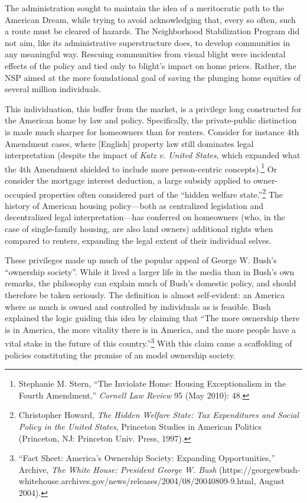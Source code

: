 \documentclass[12pt,oneside]{psthesis}
\begin{document}
The administration sought to maintain the idea of a meritocratic path to the American Dream, while trying to avoid acknowledging that, every so often, such a route must be cleared of hazards.
The Neighborhood Stabilization Program did not aim, like its administrative superstructure does, to develop communities in any meaningful way.
Rescuing communities from visual blight were incidental effects of the policy and tied only to blight's impact on home prices.
Rather, the NSP aimed at the more foundational goal of saving the plunging home equities of several million individuals.

This individuation, this buffer from the market, is a privilege long constructed for the American home by law and policy.
Specifically, the private-public distinction is made much sharper for homeowners than for renters.
Consider for instance 4th Amendment cases, where {[}English{]} property law still dominates legal interpretation (despite the impact of \emph{Katz v. United States}, which expanded what the 4th Amendment shielded to include more person-centric concepts).\footnote{Stephanie M. Stern, ``The Inviolate Home: Housing Exceptionalism in the Fourth Amendment,'' \emph{Cornell Law Review} 95 (May 2010): 48.}
Or consider the mortgage interest deduction, a large subsidy applied to owner-occupied properties often considered part of the ``hidden welfare state.''\footnote{Christopher Howard, \emph{The Hidden Welfare State: Tax Expenditures and Social Policy in the United States}, Princeton Studies in American Politics (Princeton, NJ: Princeton Univ. Press, 1997).}
The history of American housing policy---both as centralized legislation and decentralized legal interpretation---has conferred on homeowners (who, in the case of single-family housing, are also land owners) additional rights when compared to renters, expanding the legal extent of their individual selves.

These privileges made up much of the popular appeal of George W. Bush's ``ownership society''.
While it lived a larger life in the media than in Bush's own remarks, the philosophy can explain much of Bush's domestic policy, and should therefore be taken seriously.
The definition is almost self-evident: an America where as much is owned and controlled by individuals as is feasible.
Bush explained the logic guiding this idea by claiming that ``The more ownership there is in America, the more vitality there is in America, and the more people have a vital stake in the future of this country.''\footnote{``Fact Sheet: America's Ownership Society: Expanding Opportunities,'' Archive, \emph{The White House: President George W. Bush} (https://georgewbush-whitehouse.archives.gov/news/releases/2004/08/20040809-9.html, August 2004).}
With this claim came a scaffolding of policies constituting the promise of an model ownership society.
\end{document}
